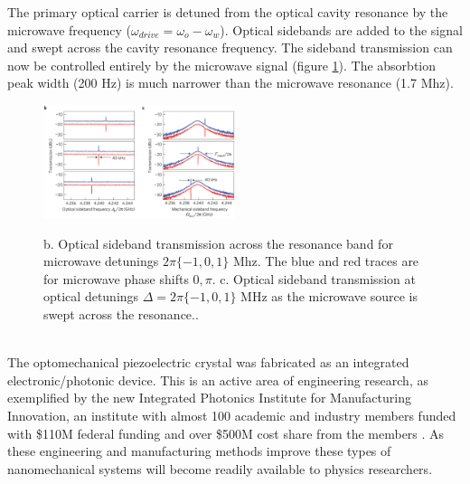 \documentclass[a4paper,11pt, twocolumn]{article}
\numberwithin{equation}{section}
\begin{document}
The primary optical carrier is detuned from the optical cavity resonance by the microwave frequency ($\omega_{drive}=\omega_{o}-\omega_w$).
Optical sidebands are added to the signal and swept across the cavity resonance frequency. 
The sideband transmission can now be controlled entirely by the microwave signal (figure \ref{fig:transparency}). 
The absorbtion peak width (200 Hz) is much narrower than the microwave resonance (1.7 Mhz). 
\begin{figure}
 \caption{ b. Optical sideband transmission across the resonance band for microwave detunings $2\pi\{-1,0,1\}$ Mhz. The blue and red traces are for microwave phase shifts $0,\pi$. c. Optical sideband transmission at optical detunings $\Delta=2\pi\{-1,0,1\}$ MHz as the microwave source is swept across the resonance.\cite{nanoCrystal}.}
 \centering
   \includegraphics[width=0.5\textwidth]{figs/opticaltransparency}
 \label{fig:transparency}
\end{figure}
\\
The optomechanical piezoelectric crystal was fabricated as an integrated electronic/photonic device.
This is an active area of engineering research, as exemplified by the new Integrated Photonics Institute for Manufacturing Innovation, 
an institute with almost 100 academic and industry members funded with \$110M federal funding and over \$500M cost share from the members \cite{ipimi}.
As these engineering and manufacturing methods improve these types of nanomechanical systems will become readily available to physics researchers.
\end{document}
